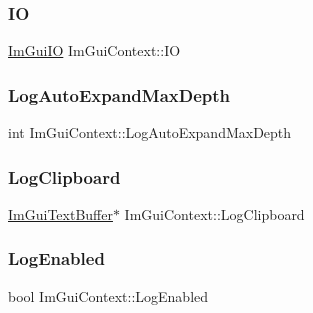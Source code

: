 \subsubsection{\texorpdfstring{IO}{IO}}
{\footnotesize\ttfamily \hyperlink{struct_im_gui_i_o}{Im\+Gui\+IO} Im\+Gui\+Context\+::\+IO}

\hypertarget{struct_im_gui_context_a153d8c6eee2acdd3676ca55aec7b1079}{}\label{struct_im_gui_context_a153d8c6eee2acdd3676ca55aec7b1079} 
\subsubsection{\texorpdfstring{Log\+Auto\+Expand\+Max\+Depth}{LogAutoExpandMaxDepth}}
{\footnotesize\ttfamily int Im\+Gui\+Context\+::\+Log\+Auto\+Expand\+Max\+Depth}

\hypertarget{struct_im_gui_context_a676007461d3ce20e50a092573dc05064}{}\label{struct_im_gui_context_a676007461d3ce20e50a092573dc05064} 
\subsubsection{\texorpdfstring{Log\+Clipboard}{LogClipboard}}
{\footnotesize\ttfamily \hyperlink{struct_im_gui_text_buffer}{Im\+Gui\+Text\+Buffer}$\ast$ Im\+Gui\+Context\+::\+Log\+Clipboard}

\hypertarget{struct_im_gui_context_a2508bec1862aa4477eca2c79d6924b82}{}\label{struct_im_gui_context_a2508bec1862aa4477eca2c79d6924b82} 
\subsubsection{\texorpdfstring{Log\+Enabled}{LogEnabled}}
{\footnotesize\ttfamily bool Im\+Gui\+Context\+::\+Log\+Enabled}

\hypertarget{struct_im_gui_context_a73a73a599720fb933e4fb5e673dde131}{}\label{struct_im_gui_context_a73a73a599720fb933e4fb5e673dde131} 
